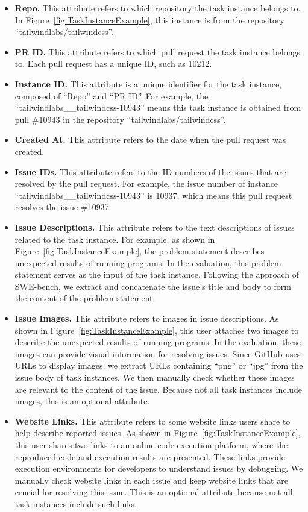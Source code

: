 \begin{itemize}[left=10pt]
    \item \textbf{Repo.} This attribute refers to which repository the task instance belongs to. In Figure~\ref{fig:TaskInstanceExample}, this instance is from the repository ``tailwindlabs/tailwindcss''. 
    \item \textbf{PR ID.} This attribute refers to which pull request the task instance belongs to. Each pull request has a unique ID, such as 10212.
    \item  \textbf{Instance ID.} This attribute is a unique identifier for the task instance, composed of ``Repo'' and ``PR ID''. For example, the ``tailwindlabs\_\_tailwindcss-10943'' means this task instance is obtained from pull \#10943 in the repository ``tailwindlabs/tailwindcss''.
    \item  \textbf{Created At.} This attribute refers to the date when the pull request was created.
    \item \textbf{Issue IDs.} This attribute refers to the ID numbers of the issues that are resolved by the pull request. For example, the issue number of instance ``tailwindlabs\_\_tailwindcss-10943'' is 10937, which means this pull request resolves the issue \#10937.
    \item \textbf{Issue Descriptions.} This attribute refers to the text descriptions of issues related to the task instance. For example, as shown in Figure~\ref{fig:TaskInstanceExample}, the problem statement describes unexpected results of running programs. In the evaluation, this problem statement serves as the input of the task instance. Following the approach of  SWE-bench, we extract and concatenate the issue's title and body to form the content of the problem statement.
    \item \textbf{Issue Images.} This attribute refers to images in issue descriptions.  As shown in Figure~\ref{fig:TaskInstanceExample}, this user attaches two images to describe the unexpected results of running programs. In the evaluation, these images can provide visual information for resolving issues. Since GitHub uses URLs to display images, we extract URLs containing ``png'' or ``jpg'' from the issue body of task instances. We then manually check whether these images are relevant to the content of the issue. Because not all task instances include images, this is an optional attribute.
    \item \textbf{Website Links.} This attribute refers to some website links users share to help describe reported issues. As shown in Figure~\ref{fig:TaskInstanceExample}, this user shares two links to an online code execution platform, where the reproduced code and execution results are presented. These links provide execution environments for developers to understand issues by debugging.  We manually check website links in each issue and keep website links that are crucial for resolving this issue. This is an optional attribute because not all task instances include such links. 


\end{itemize}
